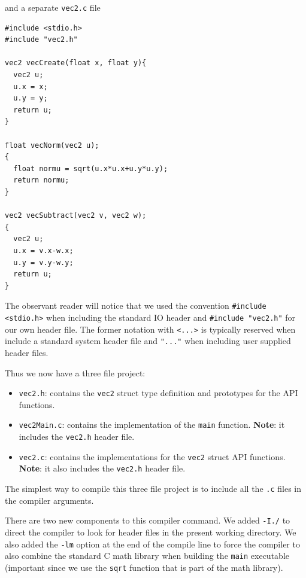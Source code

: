and a separate \texttt{vec2.c} file

\begin{verbatim}
#include <stdio.h>
#include "vec2.h"

vec2 vecCreate(float x, float y){
  vec2 u;
  u.x = x;
  u.y = y;
  return u;
}

float vecNorm(vec2 u);
{
  float normu = sqrt(u.x*u.x+u.y*u.y);
  return normu;
}

vec2 vecSubtract(vec2 v, vec2 w);
{
  vec2 u;
  u.x = v.x-w.x;
  u.y = v.y-w.y;
  return u;
}
\end{verbatim}

The observant reader will notice that we used the convention \texttt{\#include <stdio.h>} when including the standard IO header and \texttt{\#include "vec2.h"} for our own header file. The former notation with \texttt{<...>} is typically reserved when include a standard system header file and \texttt{"..."} when including user supplied header files.

Thus we now have a three file project:

\begin{itemize}
    \item[] \texttt{vec2.h}: contains the \texttt{vec2} struct type definition and prototypes for the API functions.
    
    \item[] \texttt{vec2Main.c}: contains the implementation of the \texttt{main} function. {\bf Note}: it includes the \texttt{vec2.h} header file.
    
    \item[] \texttt{vec2.c}: contains the implementations for the \texttt{vec2} struct API functions. {\bf Note}: it also includes the \texttt{vec2.h} header file.
\end{itemize}

The simplest way to compile this three file project is to include all the \texttt{.c} files in the compiler arguments.


There are two new components to this compiler command. We added \texttt{-I./} to direct the compiler to look for header files in the present working directory. We also added the \texttt{-lm} option at the end of the compile line to force the compiler to also combine the standard C math library when building the \texttt{main} executable (important since we use the \texttt{sqrt} function that is part of the math library).


